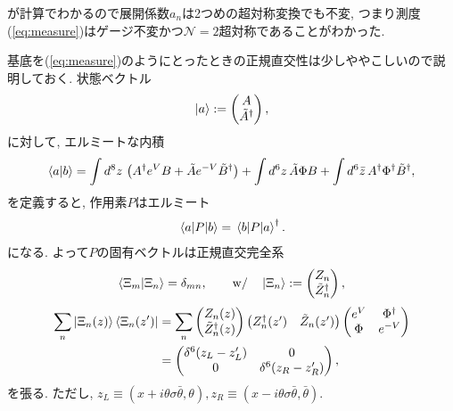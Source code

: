 \documentclass{ltjsarticle}
\theoremstyle{definition}
\begin{document}
が計算でわかるので展開係数$a_n$は2つめの超対称変換でも不変, つまり測度(\ref{eq:measure})はゲージ不変かつ$\mathcal N=2$超対称であることがわかった.\par
基底を(\ref{eq:measure})のようにとったときの正規直交性は少しややこしいので説明しておく. 状態ベクトル
\begin{align}
\ket a:=
\begin{pmatrix}
A\\\tilde A^\dagger
\end{pmatrix},
\end{align}
に対して, エルミートな内積
\begin{align}
\braket {a}{b}=\int d^8z\,\left(A^\dagger e^VB+\tilde A e^{-V}\tilde B^\dagger\right)+\int d^6z\,\tilde A\Phi B+\int d^6\bar z\,A^\dagger\Phi^\dagger\tilde B^\dagger,
\end{align}
を定義すると, 作用素$P$はエルミート
\begin{align}
\mel{a}{P}{b}=\mel{b}{P}{a}^\dagger.
\end{align}
になる. よって$P$の固有ベクトルは正規直交完全系
\begin{align}
\braket{\Xi_m}{\Xi_n}=\delta_{mn},\qquad\mathrm{w/}\quad
\ket{\Xi_n}:=
\begin{pmatrix}
Z_n\\\tilde Z_n^\dagger
\end{pmatrix},
\end{align}
\begin{align}
\sum_n\ket{\Xi_n(z)}\bra{\Xi_n(z')}&=\sum_n
\begin{pmatrix}
Z_n(z)\\\tilde Z^\dagger_n(z)
\end{pmatrix}
\begin{pmatrix}
Z^\dagger_n(z')&\tilde Z_n(z')
\end{pmatrix}
\begin{pmatrix}
e^V&\Phi^\dagger\\
\Phi&e^{-V}
\end{pmatrix}\\
&=
\begin{pmatrix}
\delta^6(z_L-z_L')&0\\
0&\delta^6(z_R-z_R')
\end{pmatrix},
\end{align}
を張る. ただし, $z_L\equiv(x+i\theta\sigma\bar\theta,\theta), z_R\equiv(x-i\theta\sigma\bar\theta,\bar\theta)$.
\end{document}
